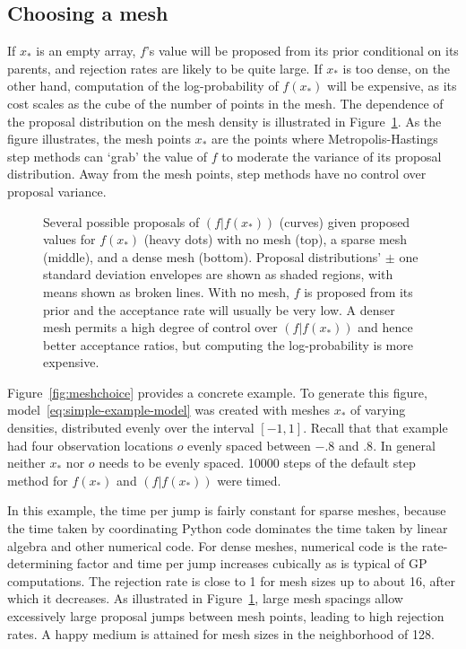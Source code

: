 \documentclass[article]{jss}
\begin{document}
\subsection{Choosing a mesh} 
\label{sec:mesh-choice} 
If $x_*$ is an empty array, $f$'s value will be proposed from its prior conditional on its parents, and rejection rates are likely to be quite large. If $x_*$ is too dense, on the other hand, computation of the log-probability of $f(x_*)$ will be expensive, as its cost scales as the cube of the number of points in the mesh. The dependence of the proposal distribution on the mesh density is illustrated in Figure~\ref{fig:meshpropose}. As the figure illustrates, the mesh points $x_*$ are the points where Metropolis-Hastings step methods can `grab' the value of $f$ to moderate the variance of its proposal distribution. Away from the mesh points, step methods have no control over proposal variance.

\begin{figure}
    \centering
    \caption{Several possible proposals of $(f|f(x_*))$ (curves) given proposed values for $f(x_*)$ (heavy dots) with no mesh (top), a sparse mesh (middle), and a dense mesh (bottom). Proposal distributions'  $\pm$ one standard deviation envelopes are shown as shaded regions, with means shown as broken lines. With no mesh, $f$ is proposed from its prior and the acceptance rate will usually be very low. A denser mesh permits a high degree of control over $(f|f(x_*))$ and hence better acceptance ratios, but computing the log-probability is more expensive.}
    \label{fig:meshpropose}
\end{figure}


Figure~\ref{fig:meshchoice} provides a concrete example. To generate this figure, model~\ref{eq:simple-example-model} was created with meshes $x_*$ of varying densities, distributed evenly over the interval $[-1,1]$. Recall that that example had four observation locations $o$ evenly spaced between $-.8$ and $.8$. In general neither $x_*$ nor $o$ needs to be evenly spaced. 10000 steps of the default step method for $f(x_*)$ and $(f|f(x_*))$ were timed. 

In this example, the time per jump is fairly constant for sparse meshes, because the time taken by coordinating Python code dominates the time taken by linear algebra and other numerical code. For dense meshes, numerical code is the rate-determining factor and time per jump increases cubically as is typical of GP computations. The rejection rate is close to 1 for mesh sizes up to about 16, after which it decreases. As illustrated in Figure~\ref{fig:meshpropose}, large mesh spacings allow excessively large proposal jumps between mesh points, leading to high rejection rates. A happy medium is attained for mesh sizes in the neighborhood of 128.
\end{document}
